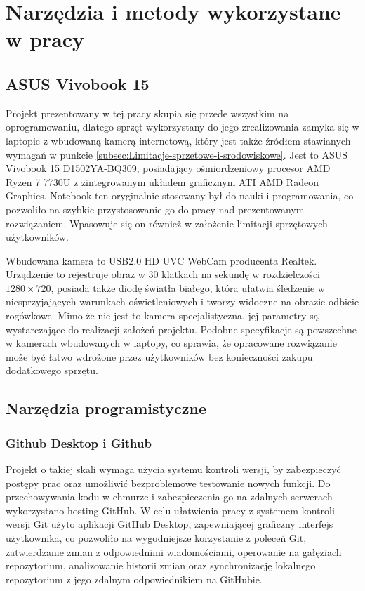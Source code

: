 \documentclass[a4paper,twoside,12pt]{book}
\begin{document}
\section{Narzędzia i metody wykorzystane w pracy}
\label{sec:Narzedzia-i-metody-wykorzystane-w-pracy}

\subsection{ASUS Vivobook 15}
\label{subsec:ASUS-Vivobook-15}

Projekt prezentowany w tej pracy skupia się przede wszystkim na oprogramowaniu, dlatego sprzęt wykorzystany do jego zrealizowania zamyka się w laptopie z wbudowaną kamerą internetową, który jest także źródłem stawianych wymagań w punkcie \ref{subsec:Limitacje-sprzetowe-i-srodowiskowe}. Jest to ASUS Vivobook 15 D1502YA-BQ309, posiadający ośmiordzeniowy procesor AMD Ryzen 7 7730U z zintegrowanym układem graficznym ATI AMD Radeon Graphics. Notebook ten oryginalnie stosowany był do nauki i programowania, co pozwoliło na szybkie przystosowanie go do pracy nad prezentowanym rozwiązaniem. Wpasowuje się on również w założenie limitacji sprzętowych użytkowników.

Wbudowana kamera to USB2.0 HD UVC WebCam producenta Realtek. Urządzenie to rejestruje obraz w 30 klatkach na sekundę w rozdzielczości $1280 \times 720$, posiada także diodę światła białego, która ułatwia śledzenie w niesprzyjających warunkach oświetleniowych i tworzy widoczne na obrazie odbicie rogówkowe. Mimo że nie jest to kamera specjalistyczna, jej parametry są wystarczające do realizacji założeń projektu. Podobne specyfikacje są powszechne w kamerach wbudowanych w laptopy, co sprawia, że opracowane rozwiązanie może być łatwo wdrożone przez użytkowników bez konieczności zakupu dodatkowego sprzętu.

\subsection{Narzędzia programistyczne}
\label{subsec:Narzedzia-programistyczne}

\subsubsection{Github Desktop i Github}

Projekt o takiej skali wymaga użycia systemu kontroli wersji, by zabezpieczyć postępy prac oraz umożliwić bezproblemowe testowanie nowych funkcji. Do przechowywania kodu w chmurze i zabezpieczenia go na zdalnych serwerach wykorzystano hosting GitHub. W celu ułatwienia pracy z systemem kontroli wersji Git użyto aplikacji GitHub Desktop, zapewniającej graficzny interfejs użytkownika, co pozwoliło na wygodniejsze korzystanie z poleceń Git, zatwierdzanie zmian z odpowiednimi wiadomościami, operowanie na gałęziach repozytorium, analizowanie historii zmian oraz synchronizację lokalnego repozytorium z jego zdalnym odpowiednikiem na GitHubie.
\end{document}

